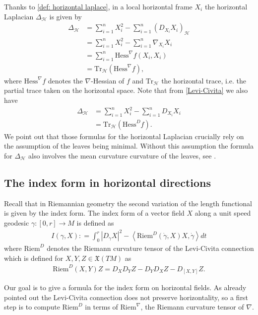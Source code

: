 \documentclass[11pt]{article}
\numberwithin{equation}{section}
\newcommand{\Riem}{\mathrm{Riem}}
\newcommand{\Ho}{\mathcal H}
\newcommand{\Dh}{{\Delta}_{\mathcal{H}}}
\begin{document}
Thanks to \eqref{def: horizontal laplace}, in a local horizontal frame $X_i$ the horizontal Laplacian $\Dh$ is given by
\begin{align*}
\Dh&=\sum_{i=1}^n X_i^2 -\sum_{i=1}^n (D_{X_i}X_i)_{\mathcal{H}} \\
 &=\sum_{i=1}^n X_i^2 -\sum_{i=1}^n \nabla_{X_i}X_i \\
 &=\sum_{i=1}^n \mathrm{Hess}^\nabla f (X_i,X_i) \\
 &=\mathrm{Tr}_\Ho( \mathrm{Hess}^\nabla f),
\end{align*}
where $\mathrm{Hess}^\nabla f$ denotes the $\nabla$-Hessian of $f$ and $\mathrm{Tr}_\Ho$ the horizontal trace, i.e. the partial trace taken on the horizontal space. Note that from \eqref{Levi-Civita} we also have
\begin{align*}
\Dh&=\sum_{i=1}^n X_i^2 -\sum_{i=1}^n D_{X_i}X_i \\
 &=\mathrm{Tr}_\Ho( \mathrm{Hess}^D f).
\end{align*}
We point out that those formulas for the horizontal Laplacian crucially rely on the assumption of the leaves being minimal.  Without this assumption the formula for $\Dh$ also involves the mean curvature curvature of the leaves, see \cite{AGAG}.


\subsection{The index form in horizontal directions}

Recall that in Riemannian geometry the second variation of the length functional is given by the index form.  The index form of a vector field $X$  along a unit speed geodesic $\gamma : [0,r] \to M $ is defined as 
\begin{align}\label{def:index}
I (\gamma,X):   =\int_0^r \left | D_{\dot \gamma}  X \right|^2 -\left \langle \mathrm{Riem}^D(\dot \gamma,X)X, \dot \gamma \right \rangle  dt
\end{align}
where $\Riem^D$ denotes the Riemann curvature tensor of  the Levi-Civita connection which is defined for $X,Y,Z \in \mathfrak{X} (TM)$ as
\begin{align}\label{riem curv}
\Riem^D(X,Y)Z=D_XD_Y Z -D_Y D_X Z -D_{[X,Y]} Z.
\end{align}

Our  goal is to give a formula for the index form on horizontal fields. As already pointed out the Levi-Civita connection does not preserve horizontality, so a first step is to compute $\Riem^D$ in terms of $\Riem^\nabla$, the Riemann curvature tensor of $\nabla$.
\end{document}
